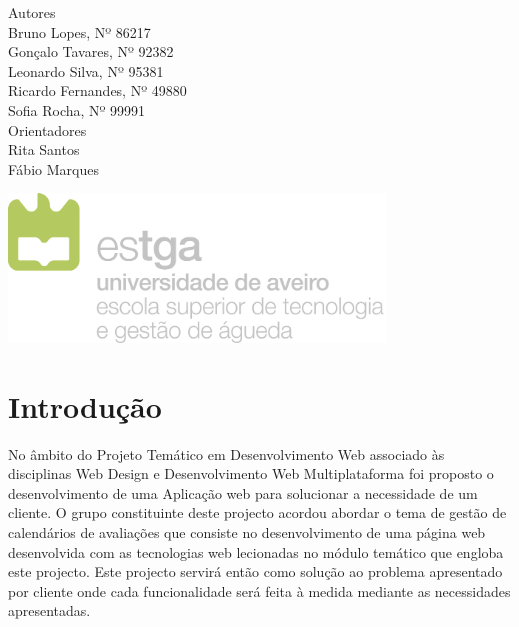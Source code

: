 \documentclass[11pt, twoside]{report}
\begin{document}
\begin{titlepage}
		
		
		\large
		Autores\\
		Bruno Lopes, Nº 86217 \\
		Gonçalo Tavares, Nº 92382  \\
		Leonardo Silva, Nº 95381 \\
		Ricardo Fernandes, Nº 49880  \\
		Sofia Rocha, Nº 99991 \\
		
		\vspace{1cm}
		Orientadores\\
		Rita Santos \\
		Fábio Marques\\
		\vspace{4cm}
		
		\centering
		\includegraphics[width=10cm]{image/AssB_vertical_cor}
		
	\end{titlepage}

	\newpage
	\setcounter{page}{1} %
	\tableofcontents %
	\thispagestyle{plain} %
	\thispagestyle{empty} %
	\newpage
	\listoftables %
	\newpage
	\listoffigures %
	
	\newpage
	
	\chapter{Introdução}
	
	No âmbito do Projeto Temático em Desenvolvimento Web associado às disciplinas Web Design e Desenvolvimento Web Multiplataforma foi proposto o desenvolvimento de uma Aplicação web para solucionar a necessidade de um cliente. 
	O grupo constituinte deste projecto acordou abordar o tema de gestão de calendários de avaliações que consiste no desenvolvimento de uma página web desenvolvida com as tecnologias web lecionadas no módulo temático que engloba este projecto.
	Este projecto servirá então como solução ao problema apresentado por cliente onde cada funcionalidade será feita à medida mediante as necessidades apresentadas.
	
\end{document}
